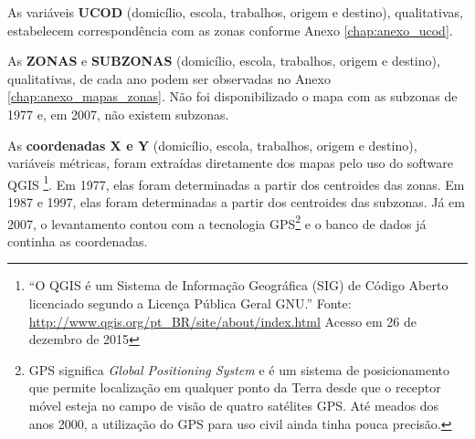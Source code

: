 \begin{table}[htb]

\end{table}

As variáveis \textbf{UCOD} (domicílio, escola, trabalhos, origem e destino), qualitativas, estabelecem correspondência com as zonas conforme Anexo \ref{chap:anexo_ucod}.

As \textbf{ZONAS} e \textbf{SUBZONAS} (domicílio, escola, trabalhos, origem e destino), qualitativas, de cada ano podem ser observadas no Anexo \ref{chap:anexo_mapas_zonas}. Não foi disponibilizado o mapa com as subzonas de 1977 e, em 2007, não existem subzonas.

As \textbf{coordenadas X e Y} (domicílio, escola, trabalhos, origem e destino), variáveis métricas, foram extraídas diretamente dos mapas pelo uso do software QGIS \footnote{``O QGIS é um Sistema de Informação Geográfica (SIG) de Código Aberto licenciado segundo a Licença Pública Geral GNU.'' Fonte: \url{http://www.qgis.org/pt_BR/site/about/index.html} Acesso em 26 de dezembro de 2015}. Em 1977, elas foram determinadas a partir dos centroides das zonas. Em 1987 e 1997, elas foram determinadas a partir dos centroides das subzonas. Já em 2007, o levantamento contou com a tecnologia GPS\footnote{GPS significa \textit{Global Positioning System} e é um sistema de posicionamento que permite localização em qualquer ponto da Terra desde que o receptor móvel esteja no campo de visão de quatro satélites GPS. Até meados dos anos 2000, a utilização do GPS para uso civil ainda tinha pouca precisão.} e o banco de dados já continha as coordenadas.

